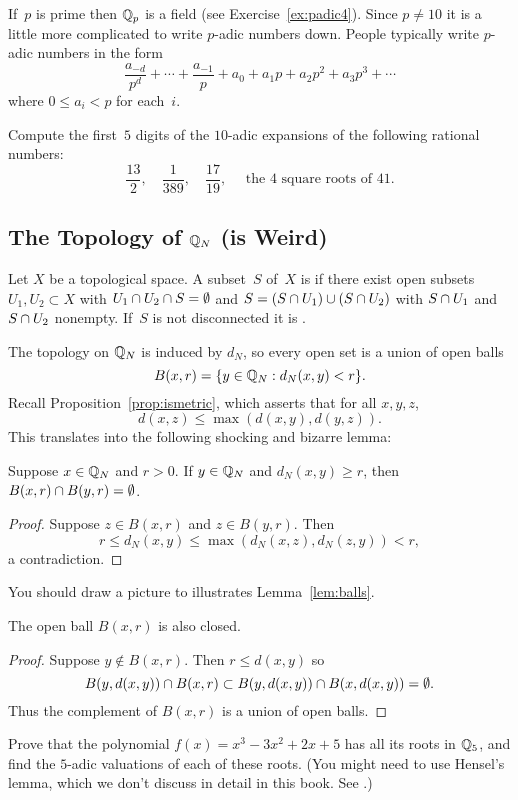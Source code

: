 If~$p$ is prime then $\mathbb{Q}_p$ is a field (see Exercise~\ref{ex:padic4}). 
Since $p\neq 10$ it is a little more
complicated to write $p$-adic numbers down.  People typically write
$p$-adic numbers in the form
$$
  \frac{a_{-\!d}}{p^{d}} + \cdots + \frac{a_{-1}}{p} + a_0 + a_1 p + a_2 p^2 + a_3 p^3 + \cdots
$$
where $0\leq a_i < p$ for each~$i$.     

\begin{exercise} \label{ex:topology7}
Compute the first~$5$ digits of the $10$-adic expansions of the following
rational numbers:
$$ 
 \frac{13}{2}, \quad \frac{1}{389}, \quad \frac{17}{19}, 
 \quad \text{ the 4 square roots of $41$}.
$$
\end{exercise}




\subsection{The Topology of $\mathbb{Q}_N$ (is Weird)}\label{sec:qnweird}
\begin{definition}[Connected]\label{def:connected}
Let $X$ be a topological space.  A subset~$S$ of~$X$ is 
if there exist open subsets $U_1, U_2\subset X$ with $U_1\cap U_2\cap S=\emptyset$
and $S=(S\cap U_1)\cup (S\cap U_2)$ with 
$S\cap U_1$ and $S\cap U_2$ nonempty.
If~$S$ is not disconnected it is .
\end{definition}

The topology on $\mathbb{Q}_N$ is induced by $d_N$, so every open set is a union 
of open balls 
$$
  B(x,r) = \{y \in \mathbb{Q}_N : d_N(x,y) < r\}.
$$
Recall Proposition~\ref{prop:ismetric}, which asserts that for
all $x,y,z$, 
$$
 d(x,z) \leq \max(d(x,y), d(y,z)).
$$
This translates into the following shocking and bizarre lemma:
\begin{lemma}\label{lem:balls}
Suppose $x\in \mathbb{Q}_N$ and $r>0$.  If $y\in\mathbb{Q}_N$ and $d_N(x,y)\geq r$, then
$B(x,r)\cap B(y,r) = \emptyset$.
\end{lemma}
\begin{proof}
Suppose $z\in B(x,r)$ and $z\in B(y,r)$.  Then 
$$
 r\leq d_N(x,y) \leq \max(d_N(x,z), d_N(z,y)) < r,
$$
a contradiction.
\end{proof}
You should draw a picture to illustrates Lemma~\ref{lem:balls}.
\begin{lemma}\label{lem:opencomplement}
The open ball $B(x,r)$ is also closed.
\end{lemma}
\begin{proof} 
Suppose $y\not\in B(x,r)$.  Then $r\leq d(x,y)$ so
$$ 
 B(y,d(x,y)) \cap B(x,r)
\subset 
 B(y,d(x,y)) \cap B(x,d(x,y))
 = \emptyset.
$$
Thus the complement of $B(x,r)$ is a union of open balls.
\end{proof}
\begin{exercise}\label{ex:topology8}
Prove that the polynomial $f(x)=x^3 - 3x^2 + 2x + 5$ 
has all its roots in $\mathbb{Q}_5$, and find the $5$-adic valuations
of each of these roots.  (You might need to use
Hensel's lemma, which we don't discuss in detail
in this book. See \cite[App.~C]{cassels:global}.)
\end{exercise} 

